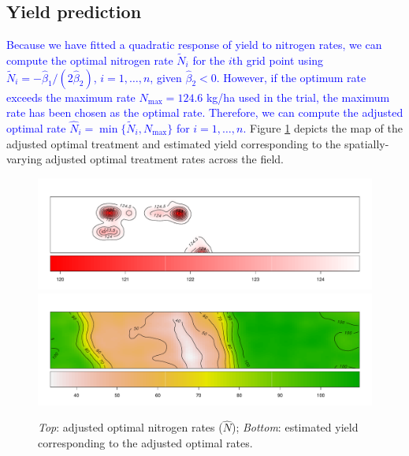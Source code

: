 \documentclass[a4paper]{article}   	%
\begin{document}
	\subsection{Yield prediction}
	
%	
		
	\textcolor{blue}{Because we have fitted a quadratic response of yield to nitrogen rates, we can compute the optimal nitrogen rate $\tilde{N}_{i}$ for the $i$th grid point using $\tilde{N}_{i} = -\hat{\beta}_{1}/(2\hat{\beta}_{2})$, $i=1,\ldots,n$, given $\hat{\beta}_{2} < 0$. However, if the optimum rate exceeds the maximum rate $N_{\mbox{max}} = 124.6$ kg/ha used in the trial, the maximum rate has been chosen as the optimal rate. Therefore, we can compute the adjusted optimal rate $\hat{N}_i = \min\{ \tilde{N}_i, N_{\mbox{max}}\}$ for $i=1,\ldots,n$.} Figure \ref{fig:optN} depicts the map of the adjusted optimal treatment and estimated yield corresponding to the spatially-varying adjusted optimal treatment rates across the field. %
		
	\begin{figure}[!htp]
		\centering	
		\includegraphics[width=\textwidth]{Images/ST_opNitrogen_v2}
		\includegraphics[width=\textwidth]{Images/ST_opYield}
		\caption{\textit{Top}: adjusted optimal nitrogen rates ($\hat{N}$); \textit{Bottom}: estimated yield corresponding to the adjusted optimal rates.}\label{fig:optN}
	\end{figure}	
	
\end{document}
